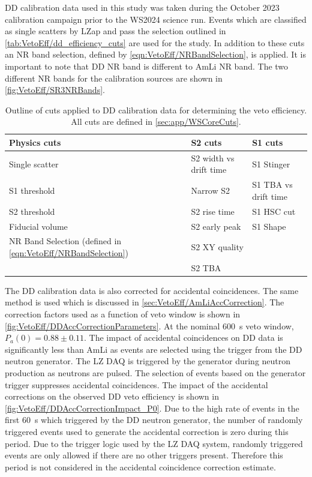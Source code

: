 DD calibration data used in this study was taken during the October 2023 calibration campaign prior to the WS2024 science run. Events which are classified as single scatters by LZap and pass the selection outlined in \autoref{tab:VetoEff/dd_efficiency_cuts} are used for the study. In addition to these cuts an NR band selection, defined by \autoref{eqn:VetoEff/NRBandSelection}, is applied. It is important to note that DD NR band is different to AmLi NR band. The two different NR bands for the calibration sources are shown in \autoref{fig:VetoEff/SR3NRBands}.

\begin{table}[!ht]
	\centering
	\caption[Outline of cuts applied to DD calibration data for determining the veto efficiency.]{Outline of cuts applied to DD calibration data for determining the veto efficiency. All cuts are defined in \autoref{sec:app/WSCoreCuts}.}
	\begin{tabular}{lll}
    \hline\hline
	\textbf{Physics cuts}&\textbf{S2 cuts}&\textbf{S1 cuts} \\
	\hline
	Single scatter & S2 width vs drift time & S1 Stinger \\
	S1 threshold & Narrow S2 & S1 TBA vs drift time  \\
	S2 threshold & S2 rise time & S1 HSC cut \\
    Fiducial volume & S2 early peak & S1 Shape \\
	NR Band Selection (defined in \autoref{eqn:VetoEff/NRBandSelection})& S2 XY quality & \\
	& S2 TBA & \\
    \hline\hline
	\end{tabular}
	\label{tab:VetoEff/dd_efficiency_cuts}
\end{table}
The DD calibration data is also corrected for accidental coincidences. The same method is used which is discussed in \autoref{sec:VetoEff/AmLiAccCorrection}. The correction factors used as a function of veto window is shown in \autoref{fig:VetoEff/DDAccCorrectionParameters}. At the nominal 600~\textmu s veto window, $P_a(0)=0.88\pm0.11$. The impact of accidental coincidences on DD data is significantly less than AmLi as events are selected using the trigger from the DD neutron generator. The LZ DAQ is triggered by the generator during neutron production as neutrons are pulsed. The selection of events based on the generator trigger suppresses accidental coincidences. The impact of the accidental corrections on the observed DD veto efficiency is shown in \autoref{fig:VetoEff/DDAccCorrectionImpact_P0}. Due to the high rate of events in the first 60~\textmu s which triggered by the DD neutron generator, the number of randomly triggered events used to generate the accidental correction is zero during this period. Due to the trigger logic used by the LZ DAQ system, randomly triggered events are only allowed if there are no other triggers present. Therefore this period is not considered in the accidental coincidence correction estimate.

